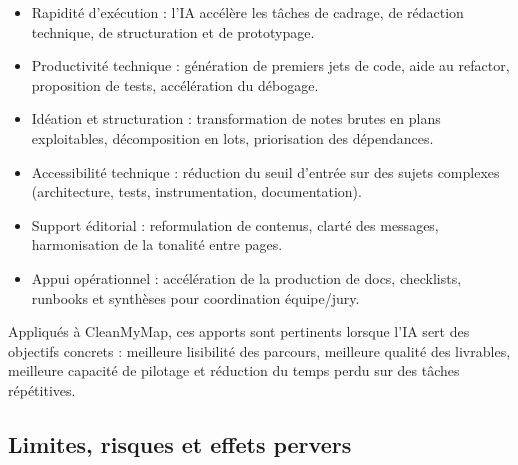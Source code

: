 \documentclass[
  10pt,
  a4paper,
  DIV=11,
  numbers=noendperiod,
  oneside]{scrreprt}
\begin{document}
\begin{itemize}
\item
  Rapidité d'exécution : l'IA accélère les tâches de cadrage, de
  rédaction technique, de structuration et de prototypage.
\item
  Productivité technique : génération de premiers jets de code, aide au
  refactor, proposition de tests, accélération du débogage.
\item
  Idéation et structuration : transformation de notes brutes en plans
  exploitables, décomposition en lots, priorisation des dépendances.
\item
  Accessibilité technique : réduction du seuil d'entrée sur des sujets
  complexes (architecture, tests, instrumentation, documentation).
\item
  Support éditorial : reformulation de contenus, clarté des messages,
  harmonisation de la tonalité entre pages.
\item
  Appui opérationnel : accélération de la production de docs,
  checklists, runbooks et synthèses pour coordination équipe/jury.
\end{itemize}

Appliqués à CleanMyMap, ces apports sont pertinents lorsque l'IA sert
des objectifs concrets : meilleure lisibilité des parcours, meilleure
qualité des livrables, meilleure capacité de pilotage et réduction du
temps perdu sur des tâches répétitives.

\subsection{Limites, risques et effets
pervers}\label{limites-risques-et-effets-pervers}
\end{document}
